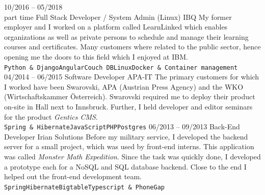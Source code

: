 \documentclass[9pt]{developercv} %
\begin{document}
\begin{entrylist}
{		}
	\entry
		{10/2016 -- 05/2018\\\footnotesize{part time}}
		{Full Stack Developer / System Admin (Linux)}
		{IBQ}
		{My former employer and I worked on a platform called LearnLinked which enables organizations as well as private persons to schedule and manage their learning courses and certificates. Many customers where related to the public sector, hence opening me the doors to this field which I enjoyed at IBM.\\ 
			\texttt{Python \& Django}\slashsep\texttt{Angular}\slashsep\texttt{Couch DB}\slashsep\texttt{Linux}\slashsep\texttt{Docker \& Container management}}
	\entry
		{04/2014 -- 06/2015}
		{Software Developer}
		{APA-IT}
		{The primary customers for which I worked have been Swarovski, APA (Austrian Press Agency) and the WKO (Wirtschaftskammer Österreich). Swarovski required me to deploy their product on-site in Hall next to Innsbruck. Further, I held developer and editor seminars for the product \textit{Gentics CMS}. \\ 
			\texttt{Spring \& Hibernate}\slashsep\texttt{JavaScript}\slashsep\texttt{PHP}\slashsep\texttt{Postgres}}
	\entry
		{06/2013 -- 09/2013}
		{Back-End Developer}
		{Irian Solutions}
		{Before my military service, I developed the backend server for a small project, which was used by front-end interns. This application was called \textit{Monster Math Expedition}. Since the task was quickly done, I developed a prototype each for a NoSQL and SQL database backend. Close to the end I helped out the front-end development team. \\ 
			\texttt{Spring}\slashsep\texttt{Hibernate}\slashsep\texttt{Bigtable}\slashsep\texttt{Typescript \& PhoneGap}}
\end{entrylist}


\end{document}
